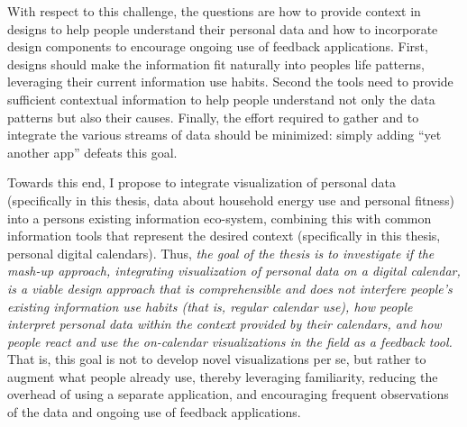 \documentclass[12pt,oneside]{book}
\begin{document}
With respect to this challenge, the questions are how to provide context in designs to help people understand their personal data and how to incorporate design components to encourage ongoing use of feedback applications.  First, designs should make the information fit naturally into peoples life patterns, leveraging their current information use habits.  Second the tools need to provide sufficient contextual information to help people understand not only the data patterns but also their causes. Finally, the effort required to gather and to integrate the various streams of data should be minimized: simply adding ``yet another app'' defeats this goal. 

Towards this end, I propose to integrate visualization of personal data (specifically in this thesis, data about household energy use and personal fitness) into a persons existing information eco-system, combining this with common information tools that represent the desired context (specifically in this thesis, personal digital calendars). Thus, \textit{the goal of the thesis is to investigate  
if the mash-up approach, integrating visualization of personal data on a digital calendar, is a viable design approach that is comprehensible and does not interfere people's existing information use habits (that is, regular calendar use),
how people interpret personal data within the context provided by their calendars,
and how people react and use the on-calendar visualizations in the field as a feedback tool.}
That is, this goal is not to develop novel visualizations per se, but rather to augment what people already use, thereby leveraging familiarity, reducing the overhead of using a separate application, and encouraging frequent observations of the data and ongoing use of feedback applications.
\end{document}
